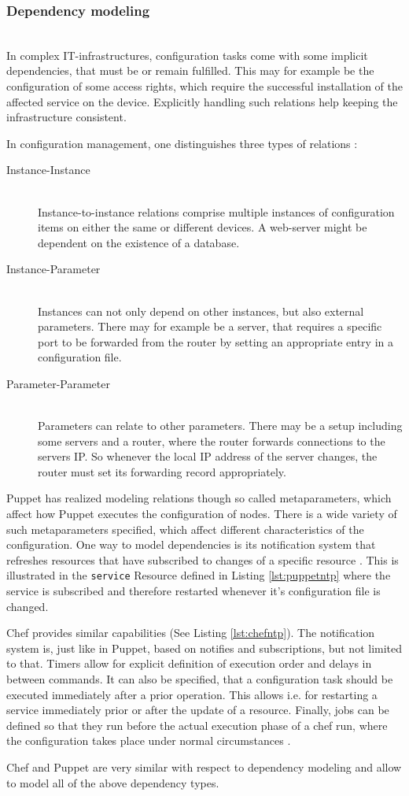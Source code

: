 \subsubsection{Dependency modeling}\hfill\\
In complex IT-infrastructures, configuration tasks come with some implicit dependencies, that must be or remain fulfilled. This may for example be the configuration of some access rights, which require the successful installation of the affected service on the device. Explicitly handling such relations help keeping the infrastructure consistent.

In configuration management, one distinguishes three types of relations \cite{delaet2010survey}:
\begin{description}
\item[Instance-Instance] \hfill \\ 
Instance-to-instance relations comprise multiple instances of configuration items on either the same or different devices. A web-server might be dependent on the existence of a database.
\item[Instance-Parameter] \hfill \\ 
Instances can not only depend on other instances, but also external parameters. There may for example be a server, that requires a specific port to be forwarded from the router by setting an appropriate entry in a configuration file.
\item[Parameter-Parameter] \hfill \\ 
Parameters can relate to other parameters. There may be a setup including some servers and a router, where the router forwards connections to the servers IP. So whenever the local IP address of the server changes, the router must set its forwarding record appropriately.
\end{description}

Puppet has realized modeling relations though so called metaparameters, which affect how Puppet executes the configuration of nodes. There is a wide variety of such metaparameters specified, which affect different characteristics of the configuration. One way to model dependencies is its notification system that refreshes resources that have subscribed to changes of a specific resource \cite{puppetcommetaparameter}. This is illustrated in the \texttt{service} Resource defined in Listing \ref{lst:puppetntp} where the service is subscribed and therefore restarted whenever it's configuration file is changed. 

Chef provides similar capabilities (See Listing \ref{lst:chefntp}). The notification system is, just like in Puppet, based on notifies and subscriptions, but not limited to that. Timers allow for explicit definition of execution order and delays in between commands. It can also be specified, that a configuration task should be executed immediately after a prior operation. This allows i.e. for restarting a service immediately prior or after the update of a resource. Finally, jobs can be defined so that they run before the actual execution phase of a chef run, where the configuration takes place under normal circumstances \cite{chefiocommonfunc}.

Chef and Puppet are very similar with respect to dependency modeling and allow to model all of the above dependency types.